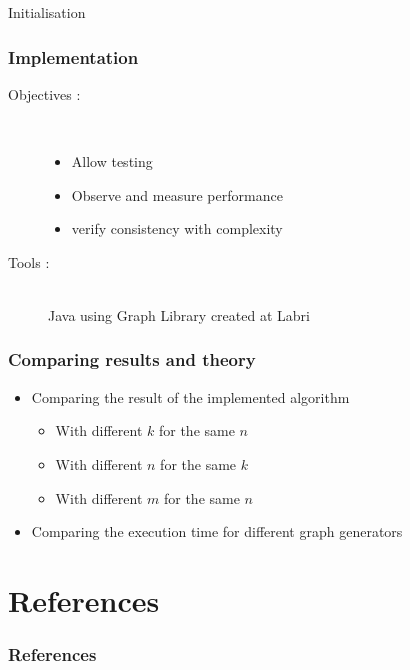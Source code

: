 \documentclass[xcolor=dvipsnames]{beamer}
\begin{document}
\begin{frame}
	\begin{algorithm}[H]
        \SetAlgoLined
    	Initialisation\;
	\end{algorithm}
\end{frame}


\begin{frame}
\frametitle{Implementation}
\begin{description}
	\item [Objectives :] \hfill \\
	\begin{itemize}
		 \item Allow testing 
		\item Observe and measure performance
        \item verify consistency with complexity
     \end{itemize}

 \item[Tools :] \hfill \\
		Java using Graph Library created at Labri
  \end{description}
\end{frame}



\begin{frame}
  \frametitle{Comparing results and theory}
  \begin{itemize}
  \item Comparing the result of the implemented algorithm
    \begin{itemize}
    \item With different $k$ for the same $n$
    \item With different $n$ for the same $k$
    \item With different $m$ for the same $n$
    \end{itemize}
  \item Comparing the execution time for different graph generators
  \end{itemize}
\end{frame}

\section*{References}
\begin{frame}[allowframebreaks]
  \frametitle{References}
  

  
\end{frame}
\end{document}
